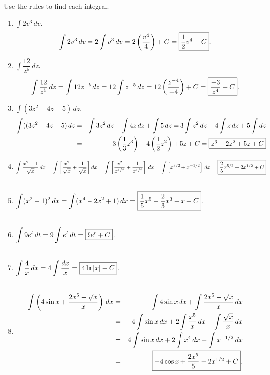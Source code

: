 \documentclass{book}
\newcommand{\dx}{\,dx}
\newcommand{\dv}{\,dv}
\newcommand{\dt}{\,dt}
\newcommand{\dz}{\,dz}
\newcommand{\dint}{\displaystyle \int}
\begin{document}
\begin{Exam} Use the rules to find each integral.
\begin{enumerate}
\item $\dint 2v^3\dv$.
\[\int 2v^3\dv = 2\int v^3\dv = 2\left(\dfrac{v^4}{4}\right) + C = \fbox{$\dfrac{1}{2}v^4  + C$}.\]

\item $\dint{ \dfrac{12}{z^5}}\dz$.
\[\int \dfrac{12}{z^5}\dz = \int{12z^{-5}}\dz = 12\int z^{-5}\dz = 12\left(\dfrac{z^{-4}}{-4}\right) + C = \fbox{$\dfrac{-3}{z^4} + C$}.\]\vs

\item $\dint (3z^2-4z + 5)\dz$.
\begin{eqnarray*}
\int ((3z^2-4z + 5)\, dz &=& \int 3z^2\,dz - \int 4z\,dz + \int 5\,dz  = 3\int z^2\,dz - 4\int z\dz + 5\int dz\\
&=& 3\left(\dfrac{1}{3}z^3\right) - 4\left(\dfrac{1}{2}z^2\right) + 5z + C = \fbox{$z^3 - 2z^2 + 5z + C$}
\end{eqnarray*}

\item $\dint \dfrac{x^2+1}{\sqrt{x}}\dx = \int \left[ \dfrac{x^2}{\sqrt{x}} + \dfrac{1}{\sqrt{x}}\right]\dx = \int \left[ \dfrac{x^2}{x^{1/2}} + \dfrac{1}{x^{1/2}}\right]\dx = \int \left[ x^{3/2} + x^{-1/2}\right]\dx = \fbox{$\dfrac{2}{5}x^{5/2} + 2x^{1/2} + C$}$\\\\

\item $\dint (x^2-1)^2\dx = \int (x^4 - 2x^2 + 1)\dx = \fbox{$\dfrac{1}{5}x^5 - \dfrac{2}{3}x^3 + x + C$}.$\\\\

\item $\dint 9e^t\dt = 9\int e^t\dt = \fbox{$9e^t + C$}$.\\\\

\item $\dint \dfrac{4}{x}\dx = 4\int \dfrac{dx}{x} = \fbox{$4\ln|x| + C$}$. \\\\

\item 
\begin{eqnarray*}
\dint \left(4\sin x + \dfrac{2x^5-\sqrt{x}}{x}\right)\dx &=& \int 4\sin x\,dx + \int\dfrac{2x^5-\sqrt{x}}{x}\dx\\ &=& 4\int \sin x\dx + 2\int\dfrac{x^5}{x}\dx - \int\dfrac{\sqrt{x}}{x}\dx\\
 &=& 4\int \sin x\dx + 2\int x^4\dx - \int x^{-1/2}\dx\\ &=& \fbox{$-4\cos x + \dfrac{2x^5}{5} - 2x^{1/2} + C$}. 
 \end{eqnarray*}
\end{enumerate}
\end{Exam}
\end{document}
